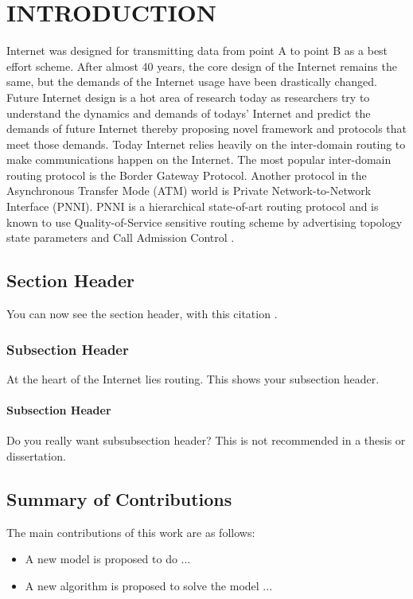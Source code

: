 \chapter{INTRODUCTION}


Internet was designed for transmitting data  from point A to point B as a best effort scheme. After almost 40 years, the core design of the Internet remains the same, but the demands of the Internet usage have been drastically changed. Future Internet design is a hot area of research today as researchers try to understand the dynamics and demands of todays' Internet and predict the demands of future Internet thereby proposing novel framework and protocols that meet those demands. 
Today Internet relies heavily on the inter-domain routing to make communications happen on the Internet. The most popular inter-domain routing protocol is the Border Gateway Protocol. Another protocol in  the Asynchronous Transfer Mode (ATM) world is Private Network-to-Network Interface (PNNI). PNNI is a hierarchical state-of-art routing protocol and is known to use Quality-of-Service sensitive routing scheme by advertising topology state parameters and Call Admission Control \cite{pnni} .



\section{Section Header}

You can now see the section header, with this citation  \cite{bgpLSurvey}. 


\subsection{Subsection Header}

At the heart of the Internet lies routing.  This shows your subsection header.


\subsubsection{Subsection Header}

Do you really want subsubsection header? This is not recommended in a thesis or dissertation.


\section{Summary of Contributions}

The main contributions of this work are as follows:

  \begin{itemize}

    \item A new model is proposed to do ...
    \item A new algorithm is proposed to solve the model ...
   
  \end{itemize}
